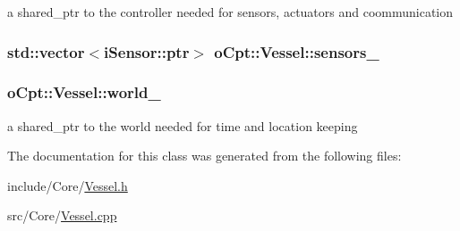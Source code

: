 a shared\+\_\+ptr to the controller needed for sensors, actuators and coommunication 

\subsubsection[{\texorpdfstring{sensors\+\_\+}{sensors_}}]{\setlength{\rightskip}{0pt plus 5cm}std\+::vector$<${\bf i\+Sensor\+::ptr}$>$ o\+Cpt\+::\+Vessel\+::sensors\+\_\+\hspace{0.3cm}{\ttfamily [protected]}}\hypertarget{classo_cpt_1_1_vessel_a7d34053ac8f878e6eeaab2567005c6d5}{}\label{classo_cpt_1_1_vessel_a7d34053ac8f878e6eeaab2567005c6d5}
\subsubsection[{\texorpdfstring{world\+\_\+}{world_}}]{ o\+Cpt\+::\+Vessel\+::world\+\_\+\hspace{0.3cm}{\ttfamily [protected]}}\hypertarget{classo_cpt_1_1_vessel_a332359ea0b37185d1b6e8acc6f50546a}{}\label{classo_cpt_1_1_vessel_a332359ea0b37185d1b6e8acc6f50546a}


a shared\+\_\+ptr to the world needed for time and location keeping 



The documentation for this class was generated from the following files\+:\begin{DoxyCompactItemize}
\item 
include/\+Core/\hyperlink{_vessel_8h}{Vessel.\+h}\item 
src/\+Core/\hyperlink{_vessel_8cpp}{Vessel.\+cpp}\end{DoxyCompactItemize}
